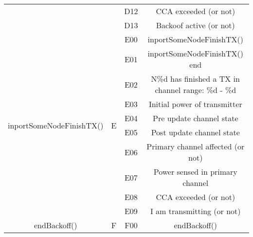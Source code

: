 \documentclass[a4paper]{article}
\begin{document}
\begin{table}[h!]
\begin{tabular}{|c|c|c|c|}
		                                           &                     & D12               & CCA exceeded (or not)                                   \\ \cline{3-4} 
		                                           &                     & D13               & Backoof active (or not)                                 \\ \hline
		\multirow{10}{*}{inportSomeNodeFinishTX()} & \multirow{10}{*}{E} & E00               & inportSomeNodeFinishTX()                                \\ \cline{3-4} 
		                                           &                     & E01               & inportSomeNodeFinishTX() end                            \\ \cline{3-4} 
		                                           &                     & E02               & N\%d has finished a TX in channel range: \%d - \%d      \\ \cline{3-4} 
		                                           &                     & E03               & Initial power of transmitter                            \\ \cline{3-4} 
		                                           &                     & E04               & Pre update channel state                                \\ \cline{3-4} 
		                                           &                     & E05               & Post update channel state                               \\ \cline{3-4} 
		                                           &                     & E06               & Primary channel affected (or not)                       \\ \cline{3-4} 
		                                           &                     & E07               & Power sensed in primary channel                         \\ \cline{3-4} 
		                                           &                     & E08               & CCA exceeded (or not)                                   \\ \cline{3-4} 
		                                           &                     & E09               & I am transmitting (or not)                              \\ \hline
		\multirow{6}{*}{endBackoff()}              & \multirow{6}{*}{F}  & F00               & endBackoff()                                            \\ \cline{3-4} 

\end{tabular}
\end{table}
\end{document}
